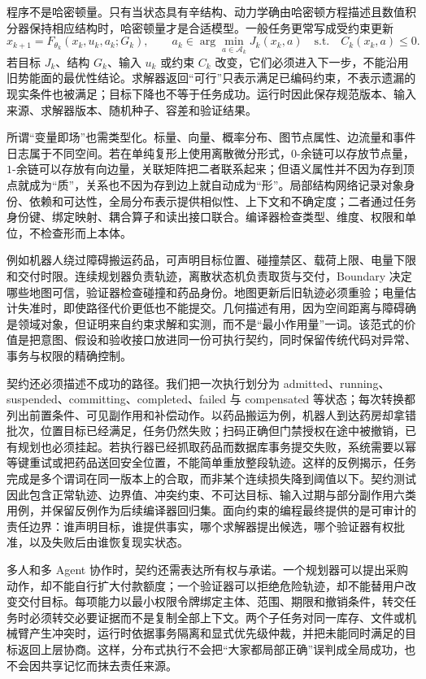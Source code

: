 程序不是哈密顿量。只有当状态具有辛结构、动力学确由哈密顿方程描述且数值积分器保持相应结构时，哈密顿量才是合适模型。一般任务更常写成受约束更新
\[
x_{k+1}=F_{\theta_k}(x_k,u_k,a_k;G_k),\qquad
a_k\in\arg\min_{a\in\mathcal A_k}J_k(x_k,a)
\quad\text{s.t.}\quad C_k(x_k,a)\le 0.
\]
若目标 $J_k$、结构 $G_k$、输入 $u_k$ 或约束 $C_k$ 改变，它们必须进入下一步，不能沿用旧势能面的最优性结论。求解器返回“可行”只表示满足已编码约束，不表示遗漏的现实条件也被满足；目标下降也不等于任务成功。运行时因此保存规范版本、输入来源、求解器版本、随机种子、容差和验证结果。

所谓“变量即场”也需类型化。标量、向量、概率分布、图节点属性、边流量和事件日志属于不同空间。若在单纯复形上使用离散微分形式，$0$-余链可以存放节点量，$1$-余链可以存放有向边量，关联矩阵把二者联系起来；但语义属性并不因为存到顶点就成为“质”，关系也不因为存到边上就自动成为“形”。局部结构网络记录对象身份、依赖和可达性，全局分布表示提供相似性、上下文和不确定度；二者通过任务身份键、绑定映射、耦合算子和读出接口联合。编译器检查类型、维度、权限和单位，不检查形而上本体。

例如机器人绕过障碍搬运药品，可声明目标位置、碰撞禁区、载荷上限、电量下限和交付时限。连续规划器负责轨迹，离散状态机负责取货与交付，Boundary 决定哪些地图可信，验证器检查碰撞和药品身份。地图更新后旧轨迹必须重验；电量估计失准时，即使路径代价更低也不能提交。几何描述有用，因为空间距离与障碍确是领域对象，但证明来自约束求解和实测，而不是“最小作用量”一词。该范式的价值是把意图、假设和验收接口放进同一份可执行契约，同时保留传统代码对异常、事务与权限的精确控制。

契约还必须描述不成功的路径。我们把一次执行划分为 admitted、running、suspended、committing、completed、failed 与 compensated 等状态；每次转换都列出前置条件、可见副作用和补偿动作。以药品搬运为例，机器人到达药房却拿错批次，位置目标已经满足，任务仍然失败；扫码正确但门禁授权在途中被撤销，已有规划也必须挂起。若执行器已经抓取药品而数据库事务提交失败，系统需要以幂等键重试或把药品送回安全位置，不能简单重放整段轨迹。这样的反例揭示，任务完成是多个谓词在同一版本上的合取，而非某个连续损失降到阈值以下。契约测试因此包含正常轨迹、边界值、冲突约束、不可达目标、输入过期与部分副作用六类用例，并保留反例作为后续编译器回归集。面向约束的编程最终提供的是可审计的责任边界：谁声明目标，谁提供事实，哪个求解器提出候选，哪个验证器有权批准，以及失败后由谁恢复现实状态。

多人和多 Agent 协作时，契约还需表达所有权与承诺。一个规划器可以提出采购动作，却不能自行扩大付款额度；一个验证器可以拒绝危险轨迹，却不能替用户改变交付目标。每项能力以最小权限令牌绑定主体、范围、期限和撤销条件，转交任务时必须转交必要证据而不是复制全部上下文。两个子任务对同一库存、文件或机械臂产生冲突时，运行时依据事务隔离和显式优先级仲裁，并把未能同时满足的目标返回上层协商。这样，分布式执行不会把“大家都局部正确”误判成全局成功，也不会因共享记忆而抹去责任来源。

